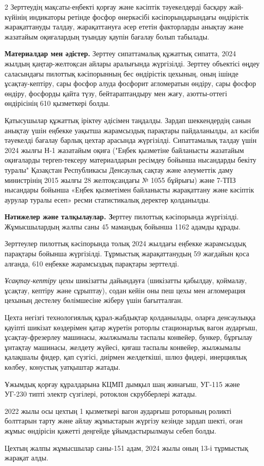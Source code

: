 \begin{multicols}{2}
Зерттеудің мақсаты-еңбекті қорғау және кәсіптік тәуекелдерді басқару
жай-күйінің индикаторы ретінде фосфор өнеркәсібі кәсіпорындарындағы
өндірістік жарақаттануды талдау, жарақаттануға әсер ететін факторларды
анықтау және жазатайым оқиғалардың туындау қаупін бағалау болып
табылады.

{\bfseries Материалдар мен әдістер.} Зерттеу сипаттамалық құжаттық сипатта,
2024 жылдың қаңтар-желтоқсан айлары аралығында жүргізілді. Зерттеу
объектісі өңдеу саласындағы пилоттық кәсіпорынның бес өндірістік
цехының, оның ішінде ұсақтау-кептіру, сары фосфор алуда фосфорит
агломератын өндіру, сары фосфор өндіру, фосфорды қайта түзу,
бейтараптандыру мен жағу, азотты-оттегі өндірісінің 610 қызметкері
болды.

Қатысушылар құжаттық іріктеу әдісімен таңдалды. Зардап шеккендердің
санын анықтау үшін еңбекке уақытша жарамсыздық парақтары пайдаланылды,
ал кәсіби тәуекелді бағалау барлық цехтар арасында жүргізілді.
Сипаттамалық талдау үшін 2024 жылғы Н-1 жазатайым оқиға ("Еңбек
қызметіне байланысты жазатайым оқиғаларды тергеп-тексеру материалдарын
ресімдеу бойынша нысандарды бекіту туралы" Қазақстан Республикасы
Денсаулық сақтау және әлеуметтік даму министрінің 2015 жылғы 28
желтоқсандағы № 1055 бұйрығы) және 7-ТПЗ нысандары бойынша «Еңбек
қызметімен байланысты жарақаттану және кәсіптік аурулар туралы есеп»
ресми статистикалық деректер қолданылды.

{\bfseries Нәтижелер және талқылаулар. З}ерттеу пилоттық кәсіпорында
жүргізілді. Жұмысшылардың жалпы саны 45 мамандық бойынша 1162 адамды
құрады.

Зерттеулер пилоттық кәсіпорында толық 2024 жылдағы еңбекке жарамсыздық
парақтары бойынша жүргізілді. Тұрмыстық жарақаттанудың 59 жағдайын қоса
алғанда, 610 еңбекке жарамсыздық парақтары зерттелді.

\emph{Ұсақтау-кептіру цехы} шикізатты дайындауға (шикізатты қабылдау,
қоймалау, ұсақтау, кептіру және сұрыптау), содан кейін оны пеш цехы мен
агломерация цехының дестелеу бөлімшесіне жіберу үшін бағытталған.

Цехта негізгі технологиялық құрал-жабдықтар қолданылады, оларға
денсаулыққа қауіпті шикізат көздерімен қатар жүретін роторлы
стационарлық вагон аударғыш, ұсақтау-фрезерлеу машинасы, жылжымалы
таспалы конвейер, бункер, бұрғылау ұнтақтау машинасы, желдету жүйесі,
қиғаш таспалы конвейер, жылжымалы қалақшалы фидер, қап сүзгісі, диірмен
желдеткіші, шлюз фидері, инерциялық көлбеу, конустық уатқыштар жатады.

Ұжымдық қорғау құралдарына КЦМП дымқыл шаң жинағыш, УГ-115 және УГ-230
типті электр сүзгілері, ротоклон скрубберлері жатады.

2022 жылы осы цехтың 1 қызметкері вагон аударғыш роторының роликті
болттарын тарту және айлау жұмыстарын жүргізу кезінде зардап шекті, оған
жұмыс өндірісін қажетті деңгейде ұйымдастырылмауы себеп болды.

Цехтың жалпы жұмысшылар саны-151 адам, 2024 жылы оның 13-і тұрмыстық
жарақат алды.
\end{multicols}

